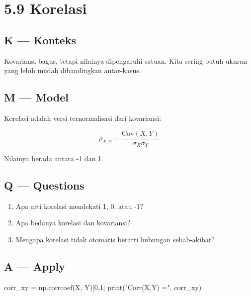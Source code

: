 \documentclass[
  letterpaper,
  DIV=11,
  numbers=noendperiod]{scrreprt}
\newenvironment{Shaded}{\begin{snugshade}}{\end{snugshade}}
\newcommand{\BuiltInTok}[1]{\textcolor[rgb]{0.00,0.23,0.31}{#1}}
\newcommand{\DecValTok}[1]{\textcolor[rgb]{0.68,0.00,0.00}{#1}}
\newcommand{\NormalTok}[1]{\textcolor[rgb]{0.00,0.23,0.31}{#1}}
\newcommand{\OperatorTok}[1]{\textcolor[rgb]{0.37,0.37,0.37}{#1}}
\newcommand{\StringTok}[1]{\textcolor[rgb]{0.13,0.47,0.30}{#1}}
\providecommand{\tightlist}{%
  \setlength{\itemsep}{0pt}\setlength{\parskip}{0pt}}
\begin{document}
\section{5.9 Korelasi}\label{korelasi}

\subsection{K --- Konteks}\label{k-konteks-37}

Kovariansi bagus, tetapi nilainya dipengaruhi satuan. Kita sering butuh
ukuran yang lebih mudah dibandingkan antar-kasus.

\subsection{M --- Model}\label{m-model-37}

Korelasi adalah versi ternormalisasi dari kovariansi:

\[
\rho_{X,Y} = \frac{\mathrm{Cov}(X,Y)}{\sigma_X \sigma_Y}
\]

Nilainya berada antara -1 dan 1.

\subsection{Q --- Questions}\label{q-questions-37}

\begin{enumerate}
\def\labelenumi{\arabic{enumi}.}
\tightlist
\item
  Apa arti korelasi mendekati 1, 0, atau -1?
\item
  Apa bedanya korelasi dan kovariansi?
\item
  Mengapa korelasi tidak otomatis berarti hubungan sebab-akibat?
\end{enumerate}

\subsection{A --- Apply}\label{a-apply-36}

\begin{Shaded}
\begin{Highlighting}[]
\NormalTok{corr\_xy }\OperatorTok{=}\NormalTok{ np.corrcoef(X, Y)[}\DecValTok{0}\NormalTok{,}\DecValTok{1}\NormalTok{]}
\BuiltInTok{print}\NormalTok{(}\StringTok{"Corr(X,Y) ="}\NormalTok{, corr\_xy)}
\end{Highlighting}
\end{Shaded}
\end{document}
